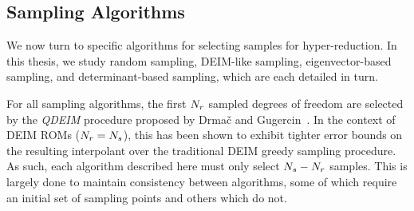 \subsection{Sampling Algorithms}
%
We now turn to specific algorithms for selecting samples for hyper-reduction. In this thesis, we study random sampling, DEIM-like sampling, eigenvector-based sampling, and determinant-based sampling, which are each detailed in turn.

For all sampling algorithms, the first $N_r$ sampled degrees of freedom are selected by the \textit{QDEIM} procedure proposed by Drma\v{c} and Gugercin~\cite{Drmac2016}. In the context of DEIM ROMs ($N_r = N_s$), this has been shown to exhibit tighter error bounds on the resulting interpolant over the traditional DEIM greedy sampling procedure. As such, each algorithm described here must only select $N_s - N_r$ samples. This is largely done to maintain consistency between algorithms, some of which require an initial set of sampling points and others which do not.

